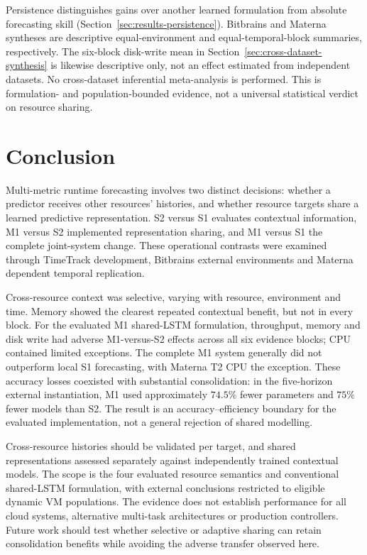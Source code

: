 \documentclass[a4paper,fleqn]{cas-dc}
\begin{document}
Persistence distinguishes gains over another learned formulation from absolute
forecasting skill (Section~\ref{sec:results-persistence}). Bitbrains and
Materna syntheses are descriptive equal-environment and equal-temporal-block
summaries, respectively. The six-block disk-write mean in
Section~\ref{sec:cross-dataset-synthesis} is likewise descriptive only, not an
effect estimated from independent datasets. No cross-dataset inferential
meta-analysis is performed. This is formulation- and population-bounded
evidence, not a universal statistical verdict on resource sharing.

\section{Conclusion}
\label{sec:conclusion}

Multi-metric runtime forecasting involves two distinct decisions: whether a
predictor receives other resources' histories, and whether resource targets
share a learned predictive representation. S2 versus S1 evaluates contextual
information, M1 versus S2 implemented representation sharing, and M1 versus S1 the complete
joint-system change. These operational contrasts were examined through
TimeTrack development, Bitbrains external environments and Materna dependent
temporal replication.

Cross-resource context was selective, varying with resource, environment and
time. Memory showed the clearest repeated contextual benefit, but not in every
block. For the evaluated M1 shared-LSTM formulation, throughput, memory and disk write had
adverse M1-versus-S2 effects across all six evidence blocks; CPU contained
limited exceptions. The complete M1 system generally did not outperform local
S1 forecasting, with Materna T2 CPU the exception. These accuracy losses
coexisted with substantial consolidation: in the five-horizon external instantiation, M1 used
approximately $74.5\%$ fewer parameters and $75\%$ fewer models than S2. The
result is an accuracy--efficiency boundary for the evaluated implementation,
not a general rejection of shared modelling.

Cross-resource histories should be validated per target, and shared
representations assessed separately against independently
trained contextual models. The scope is the four evaluated resource semantics
and conventional shared-LSTM formulation, with external conclusions restricted
to eligible dynamic VM populations. The evidence does not establish
performance for all cloud systems, alternative multi-task architectures or
production controllers. Future work should test whether selective or adaptive
sharing can retain consolidation benefits while avoiding the adverse transfer
observed here.
\end{document}
